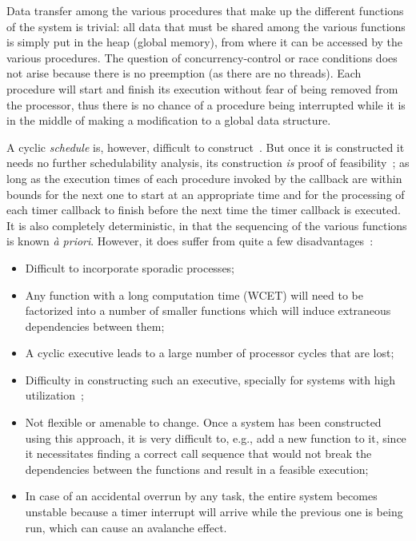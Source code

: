 Data transfer among the various procedures that make up the different
functions of the system is trivial: all data that must be shared among
the various functions is simply put in the heap (global memory), from
where it can be accessed by the various procedures. The question of
concurrency-control or race conditions does not arise because there is
no preemption (as there are no threads). Each procedure will start and
finish its execution without fear of being removed from the processor,
thus there is no chance of a procedure being interrupted while it is
in the middle of making a modification to a global data structure.

A cyclic \emph{schedule} is, however, difficult to
construct~\cite{locke@rts92}. But once it is constructed it needs no
further schedulability analysis, its construction \emph{is} proof of
feasibility~\cite{burns-rtspl}; as long as the execution times of each
procedure invoked by the callback are within bounds for the next one
to start at an appropriate time and for the processing of each timer
callback to finish before the next time the timer callback is
executed. It is also completely deterministic, in that the sequencing
of the various functions is known \emph{\`a priori}. However, it does
suffer from quite a few disadvantages~\cite{locke@rts92}:

\begin{itemize}
\item{Difficult to incorporate sporadic processes;}
\item{Any function with a long computation time (WCET) will need to be
  factorized into a number of smaller functions which will induce
  extraneous dependencies between them;}
\item{A cyclic executive leads to a large number of processor cycles
  that are lost;}
\item{Difficulty in constructing such an executive, specially for
  systems with high utilization~\cite{burns-rtspl};}
\item{Not flexible or amenable to change. Once a system has been
  constructed using this approach, it is very difficult to, e.g., add
  a new function to it, since it necessitates finding a correct call
  sequence that would not break the dependencies between the functions
  and result in a feasible execution;}
\item{In case of an accidental overrun by any task, the entire system
  becomes unstable because a timer interrupt will arrive while the
  previous one is being run, which can cause an avalanche effect.}
\end{itemize}

